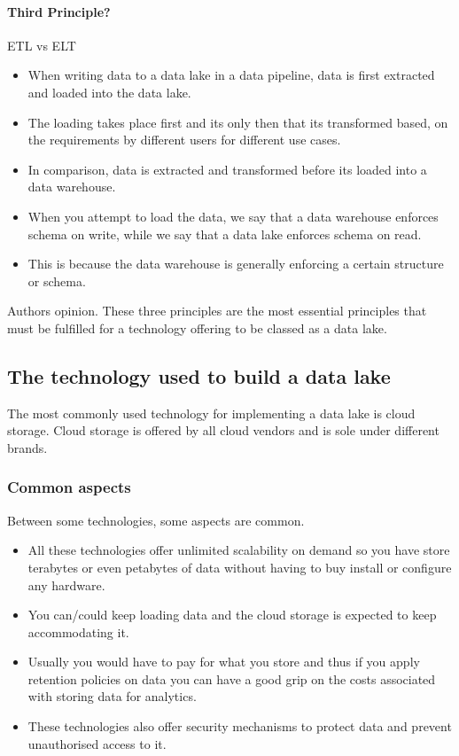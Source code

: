 \paragraph{Third Principle?}
ETL vs ELT
\begin{itemize}
    \item When writing data to a data lake in a data pipeline, data is first extracted and loaded into the data lake.
    \item The loading takes place first and its only then that its transformed based, on the requirements by different users for different use cases.
    \item In comparison, data is extracted and transformed before its loaded into a data warehouse.
    \item When you attempt to load the data, we say that a data warehouse enforces schema on write, while we say that a data lake enforces schema on read.
    \item This is because the data warehouse is generally enforcing a certain structure or schema.
\end{itemize}


\begin{note}
    Authors opinion. These three principles are the most essential principles that must be fulfilled for a technology offering to be classed as a data lake.
\end{note}

\subsection{The technology used to build a data lake}
The most commonly used technology for implementing a data lake is cloud storage.
Cloud storage is offered by all cloud vendors and is sole under different brands.

\subsubsection{Common aspects}
Between some technologies, some aspects are common.

\begin{itemize}
    \item All these technologies offer unlimited scalability on demand so you have store terabytes or even petabytes of data without having to buy install or configure any hardware.
    \item You can/could keep loading data and the cloud storage is expected to keep accommodating it.
    \item Usually you would have to pay for what you store and thus if you apply retention policies on data you can have a good grip on the costs associated with storing data for analytics.
    \item These technologies also offer security mechanisms to protect data and prevent unauthorised access to it.
\end{itemize}

